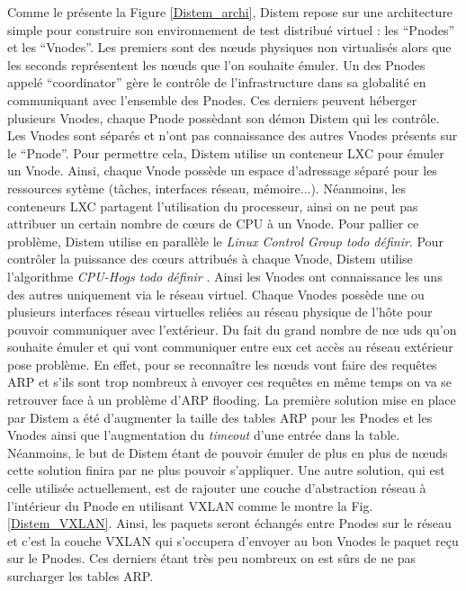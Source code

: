 Comme le présente la Figure \ref{Distem_archi}, Distem repose sur une architecture
simple pour construire son environnement de test distribué virtuel : les
``Pnodes'' et les ``Vnodes''. Les premiers sont des n\oe uds physiques non
virtualisés alors que les seconds représentent les n\oe uds que l'on souhaite
émuler. Un des Pnodes appelé ``coordinator'' gère le contrôle de
l'infrastructure dans sa globalité en communiquant avec l'ensemble des
Pnodes. Ces derniers peuvent héberger plusieurs Vnodes, chaque Pnode possèdant
son démon Distem qui les contrôle. Les Vnodes sont séparés et n'ont pas
connaissance des autres Vnodes présents sur le ``Pnode''. Pour permettre cela,
Distem utilise un conteneur LXC pour émuler un Vnode. Ainsi, chaque Vnode
possède un espace d'adressage séparé pour les ressources sytème (tâches,
interfaces réseau, mémoire...). Néanmoins, les conteneurs LXC partagent
l'utilisation du processeur, ainsi on ne peut pas attribuer un certain nombre de
c\oe urs de CPU à un Vnode. Pour pallier ce problème, Distem utilise en
parallèle le \textit{Linux Control Group{\color{red} todo définir}}. Pour
contrôler la puissance des c\oe urs attribués à chaque Vnode, Distem utilise
l'algorithme \textit{CPU-Hogs{\color{red} todo définir}}
\citep{DISTEM_buchert2011methods}. Ainsi les Vnodes ont connaissance les uns des
autres uniquement via le réseau virtuel. Chaque Vnodes possède une ou plusieurs
interfaces réseau virtuelles reliées au réseau physique de l'hôte pour pouvoir communiquer avec l'extérieur. Du fait du grand nombre de n\oe
uds qu'on souhaite émuler et qui vont communiquer entre eux cet accès au réseau
extérieur pose problème. En effet, pour se reconnaître les n\oe uds vont faire
des requêtes ARP et s'ils sont trop nombreux à envoyer ces requêtes en même
temps on va se retrouver face à un problème d'ARP flooding. La première solution
mise en place par Distem a été d'augmenter la taille des tables ARP pour les
Pnodes et les Vnodes ainsi que l'augmentation du \textit{timeout} d'une entrée
dans la table. Néanmoins, le but de Distem étant de pouvoir émuler de plus en
plus de n\oe uds cette solution finira par ne plus pouvoir s'appliquer. Une
autre solution, qui est celle utilisée actuellement, est de rajouter une couche
d'abstraction réseau à l'intérieur du Pnode en utilisant
VXLAN\citep{VXLAN_mahalingam2014virtual, DISTEM_buchert2014emulation} comme le
montre la Fig.\ref{Distem_VXLAN}. Ainsi, les paquets seront échangés entre
Pnodes sur le réseau et c'est la couche VXLAN qui s'occupera d'envoyer au bon
Vnodes le paquet reçu sur le Pnodes. Ces derniers étant très peu nombreux on est
sûrs de ne pas surcharger les tables ARP.

